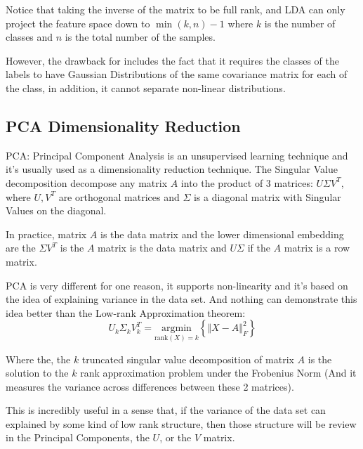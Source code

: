 \documentclass{article}
\begin{document}
        \par
        Notice that taking the inverse of the matrix to be full rank, and LDA can only project the feature space down to $\min(k, n) - 1$ where $k$ is the number of classes and $n$ is the total number of the samples. 
        \par
        However, the drawback for includes the fact that it requires the classes of the labels to have Gaussian Distributions of the same covariance matrix for each of the class, in addition, it cannot separate non-linear distributions. %
    \subsection*{PCA Dimensionality Reduction}
        \hspace{1.1em}
        PCA: Principal Component Analysis is an unsupervised learning technique and it's usually used as a dimensionality reduction technique. The Singular Value decomposition decompose any matrix $A$ into the product of 3 matrices: $U\Sigma V^T$, where $U, V^T$ are orthogonal matrices and $\Sigma$ is a diagonal matrix with Singular Values on the diagonal. 
        \par
        In practice, matrix $A$ is the data matrix and the lower dimensional embedding are the $\Sigma V^T$ is the $A$ matrix is the data matrix and $U\Sigma$ if the $A$ matrix is a row matrix. 
        \par
        PCA is very different for one reason, it supports non-linearity and it's based on the idea of explaining variance in the data set. And nothing can demonstrate this idea better than the Low-rank Approximation theorem: 
        \begin{equation*}\tag{5}\label{eqn:5}
            U_k\Sigma_k V^T_k = \underset{\text{rank}(X)=k}{\text{argmin}}  \left\lbrace
                \Vert X - A\Vert_F^2
            \right\rbrace
        \end{equation*}
        \par
        Where the, the $k$ truncated singular value decomposition of matrix $A$ is the solution to the $k$ rank approximation problem under the Frobenius Norm (And it measures the variance across differences between these 2 matrices). 
        \par
        This is incredibly useful in a sense that, if the variance of the data set can explained by some kind of low rank structure, then those structure will be review in the Principal Components, the $U$, or the $V$ matrix. 
\end{document}
